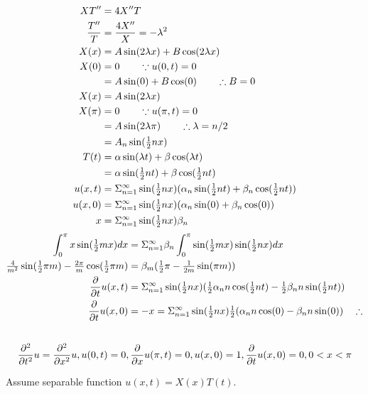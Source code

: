 \documentclass[12pt,USLetter]{article}
\begin{document}
\begin{align*}
XT^{\prime\prime} &= 4X^{\prime\prime} T \\
\frac{T^{\prime\prime}}{T} &= \frac{4X^{\prime\prime}}{X} = -\lambda^2 \\
X(x) &= A\sin(2\lambda x) + B\cos(2\lambda x) \\
X(0) &= 0 \qquad \because u(0,t) = 0 \\
&= A\sin(0) + B\cos(0) \qquad \therefore B = 0 \\
X(x) &= A\sin(2\lambda x) \\
X(\pi) &= 0 \qquad \because u(\pi,t) = 0 \\
&= A\sin(2\lambda\pi) \qquad \therefore \lambda = n/2 \\
&= A_n\sin(\tfrac{1}{2}nx) \\
T(t) &= \alpha\sin(\lambda t) + \beta\cos(\lambda t) \\
&= \alpha\sin(\tfrac{1}{2}nt) + \beta\cos(\tfrac{1}{2}nt) \\
u(x,t) &= \Sigma_{n=1}^{\infty} \sin(\tfrac{1}{2}nx)(\alpha_n\sin(\tfrac{1}{2} nt) + \beta_n\cos(\tfrac{1}{2} nt)) \\
u(x,0) &= \Sigma_{n=1}^{\infty} \sin(\tfrac{1}{2}nx)(\alpha_n\sin(0) + \beta_n\cos(0)) \\
x &= \Sigma_{n=1}^{\infty} \sin(\tfrac{1}{2} nx) \beta_n
\end{align*}
\begin{align*}
\int_0^\pi x\sin(\tfrac{1}{2} mx) dx &= \Sigma_{n=1}^{\infty} \beta_n \int_0^\pi \sin(\tfrac{1}{2} mx)\sin(\tfrac{1}{2} nx) dx \\
\tfrac{4}{m^2}\sin(\tfrac{1}{2} \pi m) - \tfrac{2\pi}{m}\cos(\tfrac{1}{2} \pi m)
&= \beta_m (\tfrac{1}{2}\pi - \tfrac{1}{2m}\sin(\pi m)) \\
\frac{\partial}{\partial{t}}u(x,t) &= \Sigma_{n=1}^{\infty} \sin(\tfrac{1}{2} nx) (\tfrac{1}{2}\alpha_nn\cos(\tfrac{1}{2} nt) - \tfrac{1}{2}\beta_nn\sin(\tfrac{1}{2} nt)) \\
\frac{\partial}{\partial{t}}u(x,0) &= -x = \Sigma_{n=1}^{\infty}\sin(\tfrac{1}{2} nx) \tfrac{1}{2}(\alpha_nn\cos(0) - \beta_nn\sin(0)) \quad \therefore  \\
\end{align*}

\subsection{}

\begin{equation*}
\frac{\partial^2}{\partial{t}^2}u = \frac{\partial^2}{\partial{x}^2}u, u(0,t) = 0, \frac{\partial}{\partial{x}}u(\pi, t) = 0, u(x,0) = 1, \frac{\partial}{\partial{t}}u(x,0) = 0, 0<x<\pi
\end{equation*}

Assume separable function $u(x,t) = X(x)T(t)$.
\end{document}
